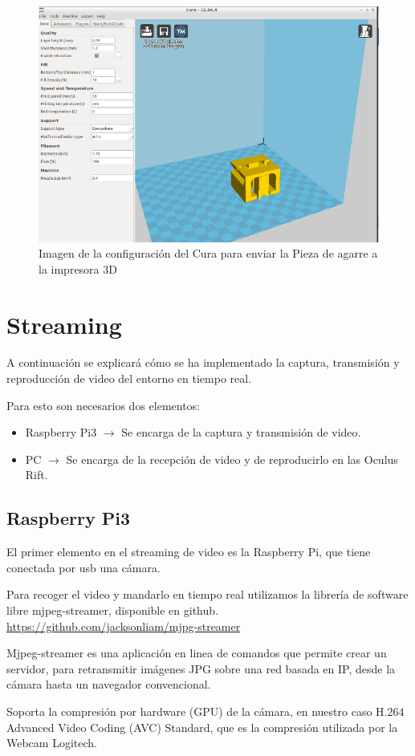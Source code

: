 \documentclass[twoside, 12pt]{epstfg}
\begin{document}
\begin{figure}[h]
	\centerline{
		\mbox{\includegraphics[width=.75\textwidth]{images/Cura2.png}}
	}
	\caption{Imagen de la configuración del Cura para enviar la Pieza de agarre a la impresora 3D}
\end{figure}
 
\newpage
\section{Streaming}
A continuación se explicará cómo se ha implementado la captura, transmisión y reproducción de video del entorno en tiempo real.

Para esto son necesarios dos elementos:
\begin{itemize}
	\item Raspberry Pi3 $\rightarrow$ Se encarga de la captura y transmisión de video.
	\item PC $\rightarrow$ Se encarga de la recepción de video y de reproducirlo en las Oculus Rift.
\end{itemize}
\subsection{Raspberry Pi3}
El primer elemento en el streaming de video es la Raspberry Pi, que tiene conectada por usb una cámara.

Para recoger el video y mandarlo en tiempo real utilizamos la librería de software libre mjpeg-streamer, disponible en github. \url{https://github.com/jacksonliam/mjpg-streamer}

Mjpeg-streamer es una aplicación en linea de comandos que permite crear un servidor, para retransmitir imágenes JPG sobre una red basada en IP, desde la cámara hasta un navegador convencional.

Soporta la compresión por hardware (GPU) de la cámara, en nuestro caso H.264 Advanced Video Coding (AVC) Standard, que es la compresión utilizada por la Webcam Logitech.
\end{document}
